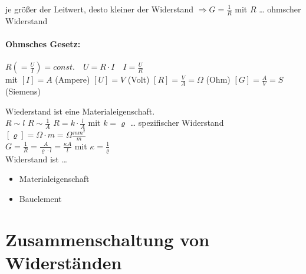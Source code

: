 je größer der Leitwert, desto kleiner der Widerstand $\Rightarrow G=\frac{1}{R}$ mit \quad $R$ … ohmscher Widerstand

\paragraph{Ohmsches Gesetz:}

$R\left(=\frac{U}{I}\right)=const. \quad U= R\cdot I \quad I = \frac{U}{R} $\\
mit $[I]=A$ (Ampere) \quad $[U]=V$ (Volt) \quad $[R]=\frac{V}{A}=\Omega$ (Ohm) \quad $[G]=\frac{A}{V} = S$ (Siemens)

Wiederstand ist eine Materialeigenschaft.\\
$R \sim l$ \quad $R\sim \frac{1}{A}$ \quad $R=k \cdot \frac{l}{A}$ mit  \quad $k=\varrho$ … spezifischer Widerstand $[\varrho]=\Omega \cdot m = \Omega \frac{mm^2}{m}$\\
$G=\frac{1}{R}=\frac{A}{\varrho \cdot l}=\frac{\kappa A}{l}$ mit \quad $\kappa = \frac{1}{\varrho}$\smallskip\\
Widerstand ist …
\begin{itemize}
\item Materialeigenschaft
\item Bauelement \\
\end{itemize}

\section{Zusammenschaltung von Widerständen}

